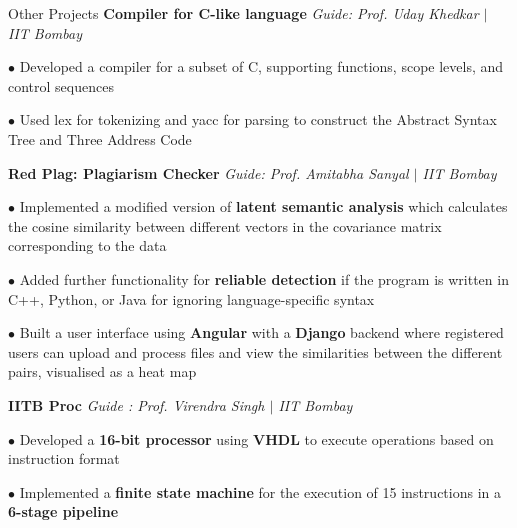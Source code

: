 \begin{rubric}{Other Projects}
    \entry*[2022] \textbf{Compiler for C-like language} \hfill \emph{Guide: Prof. Uday Khedkar $\mid$ IIT Bombay}

        $\bullet$ Developed a compiler for a subset of C, supporting functions, scope levels, and control sequences

        $\bullet$ Used lex for tokenizing and yacc for parsing to construct the Abstract Syntax Tree and Three Address Code 

    \entry*[2020] \textbf{Red Plag: Plagiarism Checker} \hfill \emph{Guide: Prof. Amitabha Sanyal $\mid$ IIT Bombay}
	    
	    $\bullet$ Implemented a modified version of \textbf{latent semantic analysis} which calculates the cosine similarity between different vectors in the covariance matrix corresponding to the data
        
        $\bullet$ Added further functionality for \textbf{reliable detection} if the program is written in C++, Python, or Java for ignoring language-specific syntax

        $\bullet$ Built a user interface using \textbf{Angular} with a \textbf{Django} backend where registered users can upload and process files and view the similarities between the different pairs, visualised as a heat map

    \entry*[2021] \textbf{IITB Proc} \hfill \emph{Guide : Prof. Virendra Singh $\mid$ IIT Bombay}
        
        $\bullet$ Developed a \textbf{16-bit processor} using \textbf{VHDL} to execute operations based on instruction format

        $\bullet$ Implemented a \textbf{finite state machine} for the execution of 15 instructions in a \textbf{6-stage pipeline}


        
        
\end{rubric}